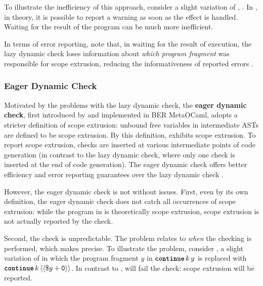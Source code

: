 To illustrate the inefficiency of this approach, consider a slight variation of , . In , in theory, it is possible to report a warning as soon as the effect is handled. Waiting for the result of the program can be much more inefficient. 

In terms of error reporting, note that, in waiting for the result of execution, the lazy dynamic check loses information about \textit{which program fragment} was responsible for scope extrusion, reducing the informativeness of reported errors \citep{kiselyov-14}.  

\subsubsection{Eager Dynamic Check}\label{subsubsection:eager-dynamic-check}
Motivated by the problems with the lazy dynamic check, the \textbf{eager dynamic check}, first introduced by \citet{kiselyov-14} and implemented in BER MetaOCaml, adopts a stricter definition of scope extrusion: unbound free variables in intermediate ASTs are defined to be scope extrusion. By this definition,  exhibits scope extrusion. To report scope extrusion, checks are inserted at various intermediate points of code generation (in contrast to the lazy dynamic check, where only one check is inserted at the end of code generation). The eager dynamic check offers better efficiency and error reporting guarantees over the lazy dynamic check \citep{kiselyov-14}.

However, the eager dynamic check is not without issues. First, even by its own definition, the eager dynamic check does not catch all occurrences of scope extrusion: while the program in  is theoretically scope extrusion, scope extrusion is not actually reported by the check. 

Second, the check is unpredictable. The problem relates to \textit{when} the checking is performed, which  makes precise. To illustrate the problem, consider , a slight variation of  in which the program fragment $y$ in $\continue{k}{y}$ is replaced with $\continue{k}{\equote[{\splice[y] + \texttt{0}}]}$. In contrast to ,  will fail the check: scope extrusion will be reported. 


